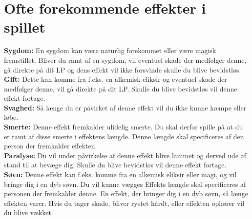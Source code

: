 \section*{Ofte forekommende effekter i spillet}
\textbf{Sygdom:} En sygdom kan være naturlig forekommet eller være magisk fremstillet. Bliver du ramt af en sygdom, vil eventuel skade der medfølger denne, gå direkte på dit LP og dens effekt vil ikke forsvinde skulle du blive bevidstløs.\\
\textbf{Gift:} Dette kan komme fra f.eks. en alkemisk eliksir og eventuel skade der medfølger denne, vil gå direkte på dit LP. Skulle du blive bevidstløs vil denne effekt fortage.\\
\textbf{Svaghed:} Så længe du er påvirket af denne effekt vil du ikke kunne kæmpe eller løbe.\\
\textbf{Smerte:} Denne effekt fremkalder ulidelig smerte. Du skal derfor spille på at du er ramt af disse smerte i effektens længde. Denne længde skal specificeres af den person der fremkalder effekten.\\
\textbf{Paralyse:} Du vil under påvirkelse af denne effekt blive lammet og derved ude af stand til at bevæge dig. Skulle du blive bevidstløs vil denne effekt fortage.\\
\textbf{Søvn:} Denne effekt kan f.eks. komme fra en alkemisk eliksir eller magi, og vil bringe dig i en dyb søvn. Du vil kunne vægges 
Effekts længde skal specificeres af personen der fremkalder denne.
En effekt, der bringer dig i en dyb søvn, så længe effekten varer. Hvis du tager skade, bliver rystet hårdt, eller effekten ophører vil du blive vækket.\\